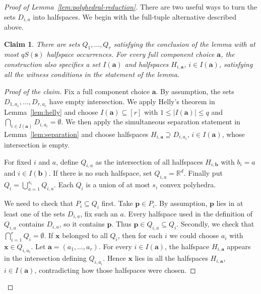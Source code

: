 \documentclass[11pt]{article}
\newtheorem{claim}[theorem]{Claim}
\theoremstyle{definition}
\newenvironment{poc}{\begin{proof}[Proof of the claim]\renewcommand*{\qedsymbol}{\(\blacksquare\)}}{\end{proof}}
\newcommand*{\abs}[1]{\lvert#1\rvert}
\newcommand{\R}{\mathbb{R}}
\begin{document}
\begin{proof}[Proof of Lemma~\ref{lem:polyhedral-reduction}]
There are two useful ways to turn the sets \(D_{i,a}\) into halfspaces. We begin with the full-tuple alternative described above.

    \begin{claim}\label{claim:full-tuple-construction}
There are sets \(Q_{1},\ldots,Q_{r}\) satisfying the conclusion of the lemma with at most \(qS(\boldsymbol{s})\) halfspace occurrences. For every full component choice \(\boldsymbol{a}\), the construction also specifies a set \(I(\boldsymbol{a})\) and halfspaces \(H_{i,\boldsymbol{a}}\), \(i\in I(\boldsymbol{a})\), satisfying all the witness conditions in the statement of the lemma.
\end{claim}
\begin{poc}
Fix a full component choice \(\boldsymbol{a}\). By assumption, the sets \(D_{1,a_{1}},\ldots,D_{r,a_{r}}\) have empty intersection. We apply Helly's theorem in Lemma~\ref{lem:helly} and choose \(I(\boldsymbol{a})\subseteq [r]\) with \(1\le\abs{I(\boldsymbol{a})}\le q\) and \(\bigcap_{i\in I(\boldsymbol{a})}D_{i,a_{i}}=\emptyset\). We then apply the simultaneous separation statement in Lemma~\ref{lem:separation} and choose halfspaces \(H_{i,\boldsymbol{a}}\supseteq D_{i,a_{i}}\), \(i\in I(\boldsymbol{a})\), whose intersection is empty.

For fixed \(i\) and \(a\), define \(Q_{i,a}\) as the intersection of all halfspaces \(H_{i,\boldsymbol{b}}\) with \(b_{i}=a\) and \(i\in I(\boldsymbol{b})\). If there is no such halfspace, set \(Q_{i,a}=\R^{d}\). Finally put \(Q_{i}=\bigcup_{a=1}^{s_{i}}Q_{i,a}\). Each \(Q_{i}\) is a union of at most \(s_{i}\) convex polyhedra.

We need to check that \(P_{i}\subseteq Q_{i}\) first. Take \(\boldsymbol{p}\in P_{i}\). By assumption, \(\boldsymbol{p}\) lies in at least one of the sets \(D_{i,a}\), fix such an \(a\). Every halfspace used in the definition of \(Q_{i,a}\) contains \(D_{i,a}\), so it contains \(\boldsymbol{p}\). Thus \(\boldsymbol{p}\in Q_{i,a}\subseteq Q_{i}\). Secondly, we check that \(\bigcap_{i=1}^{r}Q_{i}=\emptyset\). If \(\boldsymbol{x}\) belonged to all \(Q_{i}\), then for each \(i\) we could choose \(a_{i}\) with \(\boldsymbol{x}\in Q_{i,a_{i}}\). Let \(\boldsymbol{a}=(a_{1},\ldots,a_{r})\). For every \(i\in I(\boldsymbol{a})\), the halfspace \(H_{i,\boldsymbol{a}}\) appears in the intersection defining \(Q_{i,a_{i}}\). Hence \(\boldsymbol{x}\) lies in all the halfspaces \(H_{i,\boldsymbol{a}}\), \(i\in I(\boldsymbol{a})\), contradicting how those halfspaces were chosen.


\end{poc}
\end{proof}
\end{document}
